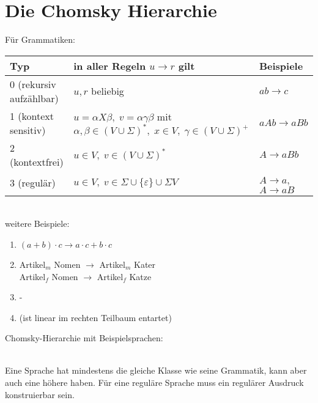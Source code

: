 \section{Die Chomsky Hierarchie}
Für Grammatiken:\\
\begin{tabular}{L{0.3} L{0.5} L{0.2}}
Typ & in aller Regeln $u\to r$ gilt & Beispiele\\
 (rekursiv aufzählbar) & $u,r$ beliebig & $ab\to c$\\
1 (kontext sensitiv) & $u=\alpha X \beta, \; v = \alpha \gamma \beta$ mit $\alpha, \beta \in (V\cup \Sigma)^*, \; x \in V, \; \gamma \in (V\cup \Sigma)^+$ & $aAb \to aBb$\\
2 (kontextfrei) & $u \in V, \; v\in (V \cup \Sigma)^*$ & $A \to aBb$\\
3 (regulär) & $u\in V, \; v \in \Sigma \cup \{\varepsilon\} \cup \Sigma V$ & $A \to a$, $A\to aB$
\end{tabular}\\
weitere Beispiele:
\begin{enumerate}[start=0]
\item $(a+b) \cdot c \to a\cdot c + b \cdot c$
\item Artikel$_m$ Nomen $\to$ Artikel$_m$ Kater\\
Artikel$_f$ Nomen $\to$ Artikel$_f$ Katze
\item - 
\item (ist linear im rechten Teilbaum entartet)
\end{enumerate}
Chomsky-Hierarchie mit Beispielsprachen:\\
\\
Eine Sprache hat mindestens die gleiche Klasse wie seine Grammatik, kann aber auch eine höhere haben. Für eine reguläre Sprache muss ein regulärer Ausdruck konstruierbar sein.

